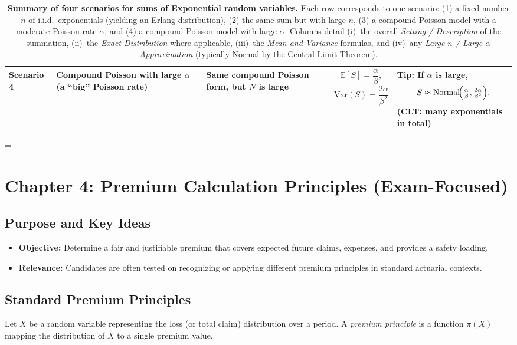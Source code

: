 \documentclass[13pt,a4paper]{article}
\begin{document}
\begin{table}[ht]
\begin{tabular}{l p{3.0cm} p{3.4cm} p{3.6cm} p{3.9cm}}
    \textbf{Scenario 4} 
    & \parbox{3.0cm}{\centering Compound Poisson \\ with large $\alpha$ \\ (a “big” Poisson rate)}
    & \parbox{3.4cm}{\centering Same compound Poisson form, but $N$ is large}
    & \parbox{3.6cm}{\centering
      \[\displaystyle \mathbb{E}[S] = \frac{\alpha}{\beta},\]
       \[\mathrm{Var}(S) = \frac{2\alpha}{\beta^2}\]}
    & \parbox{3.9cm}{ \centering
      \textbf{Tip}: If $\alpha$ is large, 
      \[\,S \approx \mathrm{Normal}\!\Bigl(\tfrac{\alpha}{\beta},\tfrac{2\alpha}{\beta^2}\Bigr).\]\\
      (CLT: many exponentials in total)
    }
    \\
    \hline
    \end{tabular}
    \caption{\textbf{Summary of four scenarios for sums of Exponential random variables.} 
Each row corresponds to one scenario: 
(1) a fixed number \(n\) of i.i.d.\ exponentials (yielding an Erlang distribution),
(2) the same sum but with large \(n\), 
(3) a compound Poisson model with a moderate Poisson rate \(\alpha\), 
and (4) a compound Poisson model with large \(\alpha\). 
Columns detail (i)~the overall \emph{Setting / Description} of the summation, 
(ii)~the \emph{Exact Distribution} where applicable, 
(iii)~the \emph{Mean and Variance} formulas, 
and (iv)~any \emph{Large-\(n\) / Large-\(\alpha\) Approximation} (typically Normal by the Central Limit Theorem). }
\end{table}
=

\section{Chapter 4: Premium Calculation Principles (Exam-Focused)}
\label{sec:chapter4}

\subsection{Purpose and Key Ideas}
\begin{itemize}
  \item \textbf{Objective:} Determine a fair and justifiable premium that covers expected future claims, expenses, and provides a safety loading.
  \item \textbf{Relevance:} Candidates are often tested on recognizing or applying different premium principles in standard actuarial contexts.
\end{itemize}

\subsection{Standard Premium Principles}
Let \(X\) be a random variable representing the loss (or total claim) distribution over a period. A \emph{premium principle} is a function \(\pi(X)\) mapping the distribution of \(X\) to a single premium value.
\end{document}
